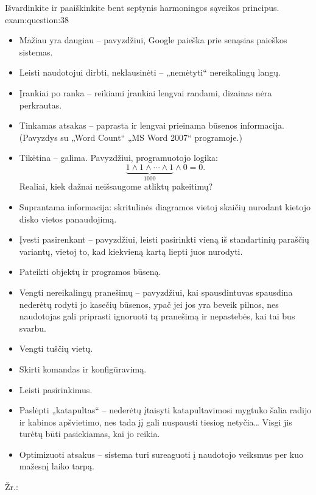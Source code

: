 \begin{question}{%
  Išvardinkite ir paaiškinkite bent septynis harmoningos sąveikos
  principus.
  }{exam:question:38}
  \begin{itemize}
    \item Mažiau yra daugiau – pavyzdžiui, Google paieška prie senąsias
      paieškos sistemas.
    \item Leisti naudotojui dirbti, neklausinėti – „nemėtyti“ nereikalingų
      langų.
    \item Įrankiai po ranka – reikiami įrankiai lengvai randami,
      dizainas nėra perkrautas.
    \item Tinkamas atsakas  – paprasta ir lengvai prieinama
      būsenos informacija. (Pavyzdys su „Word Count“ „MS Word 2007“
      programoje.)
    \item Tikėtina – galima. Pavyzdžiui, programuotojo logika:
      \begin{equation*}
        \underbrace{1 \land 1 \land \cdots \land 1}_{1000} \land 0 = 0.
      \end{equation*}
      Realiai, kiek dažnai neišsaugome atliktų pakeitimų?
    \item Suprantama informacija: skritulinės diagramos vietoj skaičių
      nurodant kietojo disko vietos panaudojimą.
    \item Įvesti pasirenkant – pavyzdžiui, leisti pasirinkti vieną iš
      standartinių paraščių variantų, vietoj to, kad kiekvieną kartą
      liepti juos nurodyti.
    \item Pateikti objektų ir programos būseną.
    \item Vengti nereikalingų pranešimų – pavyzdžiui, kai spausdintuvas
      spausdina nederėtų rodyti jo kasečių būsenos, ypač jei jos yra
      beveik pilnos, nes naudotojas gali priprasti ignoruoti tą
      pranešimą ir nepastebės, kai tai bus svarbu.
    \item Vengti tuščių vietų.
    \item Skirti komandas ir konfigūravimą.
    \item Leisti pasirinkimus.
    \item Paslėpti „katapultas“ – nederėtų įtaisyti katapultavimosi mygtuko
      šalia radijo ir kabinos apšvietimo, nes tada jį gali nuspausti
      tiesiog netyčia… Visgi jis turėtų būti pasiekiamas, kai jo reikia.
    \item Optimizuoti atsakus – sistema turi sureaguoti į naudotojo
      veiksmus per kuo mažesnį laiko tarpą.
  \end{itemize}
  Žr.: \cite[6--21]{skaidres-15}
\end{question}

